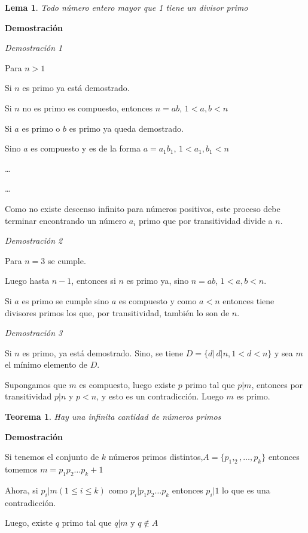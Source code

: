 \documentclass[a4paper,1pt]{report}
\newtheorem*{teo}{Teorema}
\newtheorem*{lem}{Lema}
\begin{document}
\begin{lem}
 Todo número entero mayor que 1 tiene un divisor primo
\end{lem}

\textbf{Demostración}

\textit{Demostración 1}

Para $n>1$

Si $n$ es primo ya está demostrado.

Si $n$ no es primo es compuesto, entonces $n=ab$, $1<a,b<n$

Si $a$ es primo o $b$ es primo ya queda demostrado.

Sino $a$ es compuesto y es de la forma $a=a_1b_1$, $1<a_1,b_1<n$

\dots

\dots

Como no existe descenso infinito para números positivos, este proceso debe terminar encontrando un número $a_i$ primo que por transitividad divide a $n$.

\textit{Demostración 2}

Para $n=3$ se cumple.

Luego hasta $n-1$, entonces si $n$ es primo ya, sino $n=ab$, $1<a,b<n$.

Si $a$ es primo se cumple sino $a$ es compuesto y como $a<n$ entonces tiene divisores primos los que, por transitividad, también lo son de $n$.

\textit{Demostración 3}

Si $n$ es primo, ya está demostrado.
Sino, se tiene $D=\{d|\, d|n, 1<d<n\}$ y sea $m$ el mínimo elemento de $D$. 

Supongamos que $m$ es compuesto, luego existe $p$ primo tal que $p|m$, entonces por transitividad $p|n$ y $p<n$, y esto es un contradicción. Luego $m$ es primo.

\begin{teo}
 Hay una infinita cantidad de números primos
\end{teo}

\textbf{Demostración}

Si tenemos el conjunto de $k$ números primos distintos,$A=\{p_1,_2,\dots ,p_k\}$
entonces tomemos $m=p_1p_2\dots p_k+1$

Ahora, si $p_i|m (1\leq i\leq k)$ como $p_i|p_1p_2\dots p_k$  entonces $p_i|1$ lo que es una contradicción.

Luego, existe $q$ primo tal que $q|m$ y $q\not\in A$
\end{document}
